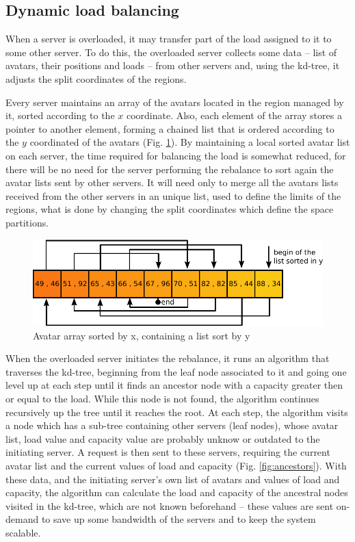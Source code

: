 \documentclass[acmjacm]{acmtrans2m}
\newcommand{\figurecaption}{Fig.}
\begin{document}
\subsection{Dynamic load balancing}

When a server is overloaded, it may transfer part of the load assigned to it to some other server. To do this, the overloaded server collects some data -- list of avatars, their positions and loads -- from other servers and, using the kd-tree, it adjusts the split coordinates of the regions.

Every server maintains an array of the avatars located in the region managed by it, sorted according to the $x$ coordinate. Also, each element of the array stores a pointer to another element, forming a chained list that is ordered according to the $y$ coordinated of the avatars (\figurecaption{} \ref{fig:vectorxlisty}). By maintaining a local sorted avatar list on each server, the time required for balancing the load is somewhat reduced, for there will be no need for the server performing the rebalance to sort again the avatar lists sent by other servers. It will need only to merge all the avatars lists received from the other servers in an unique list, used to define the limits of the regions, what is done by changing the split coordinates which define the space partitions.

\begin{figure}
  \centering
  \includegraphics[width=0.9\linewidth]{images/vectorxlisty}
  \caption{Avatar array sorted by x, containing a list sort by y}
   \label{fig:vectorxlisty}
\end{figure}

When the overloaded server initiates the rebalance, it runs an algorithm that traverses the kd-tree, beginning from the leaf node associated to it and going one level up at each step until it finds an ancestor node with a capacity greater then or equal to the load. While this node is not found, the algorithm continues recursively up the tree until it reaches the root. At each step, the algorithm visits a node which has a sub-tree containing other servers (leaf nodes), whose avatar list, load value and capacity value are probably unknow or outdated to the initiating server. A request is then sent to these servers, requiring the current avatar list and the current values of load and capacity (\figurecaption{} \ref{fig:ancestors}). With these data, and the initiating server's own list of avatars and values of load and capacity, the algorithm can calculate the load and capacity of the ancestral nodes visited in the kd-tree, which are not known beforehand -- these values are sent on-demand to save up some bandwidth of the servers and to keep the system scalable.
\end{document}
